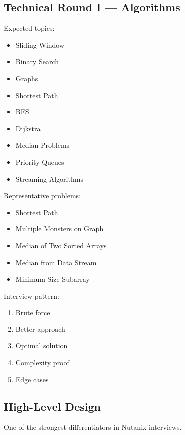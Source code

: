 \documentclass[11pt,a4paper]{article}
\begin{document}

\subsection{Technical Round I --- Algorithms}

Expected topics:

\begin{itemize}
	\item Sliding Window
	\item Binary Search
	\item Graphs
	\item Shortest Path
	\item BFS
	\item Dijkstra
	\item Median Problems
	\item Priority Queues
	\item Streaming Algorithms
\end{itemize}

Representative problems:

\begin{itemize}
	\item Shortest Path
	\item Multiple Monsters on Graph
	\item Median of Two Sorted Arrays
	\item Median from Data Stream
	\item Minimum Size Subarray
\end{itemize}

Interview pattern:

\begin{enumerate}
	\item Brute force
	\item Better approach
	\item Optimal solution
	\item Complexity proof
	\item Edge cases
\end{enumerate}


\subsection{High-Level Design}

One of the strongest differentiators in Nutanix interviews.
\end{document}
